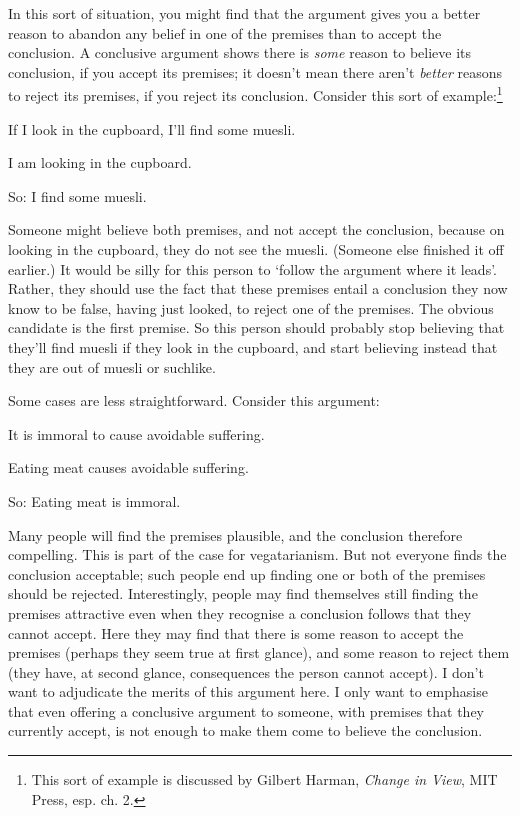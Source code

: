 In this sort of situation, you might find that the argument gives you a better reason to abandon any belief in one of the premises than to accept the conclusion. A conclusive argument shows there is \emph{some} reason to believe its conclusion, if you accept its premises; it doesn't mean there aren't \emph{better} reasons to reject its premises, if you reject its conclusion. Consider this sort of example:\footnote{This sort of example is discussed by Gilbert Harman, \emph{Change in View}, MIT Press, esp. ch. 2.} \begin{earg}
	\item[] If I look in the cupboard, I'll find some muesli.
	\item[] I am looking in the cupboard.
	\item[So:] I find some muesli.
\end{earg} Someone might believe both premises, and not accept the conclusion, because on looking in the cupboard, they do not see the muesli. (Someone else finished it off earlier.) It would be silly for this person to `follow the argument where it leads'. Rather, they should use the fact that these premises entail a conclusion they now know to be false, having just looked, to reject one of the premises. The obvious candidate is the first premise. So this person should probably stop believing that they'll find muesli if they look in the cupboard, and start believing instead that they are out of muesli or suchlike.

Some cases are less straightforward. Consider this argument: \begin{earg}
	\item[] It is immoral to cause avoidable suffering. 
	\item[] Eating meat causes avoidable suffering.
	\item[So:] Eating meat is immoral.
\end{earg}
Many people will find the premises plausible, and the conclusion therefore compelling. This is part of the case for vegatarianism. But not everyone finds the conclusion acceptable; such people end up finding one or both of the premises should be rejected. Interestingly, people may find themselves still finding the premises attractive even when they recognise a conclusion follows that they cannot accept. Here they may find that there is some reason to accept the premises (perhaps they seem true at first glance), and some reason to reject them (they have, at second glance, consequences the person cannot accept). I don't want to adjudicate the merits of this argument here. I only want to emphasise that even offering a conclusive argument to someone, with premises that they currently accept, is not enough to make them come to believe the conclusion.

